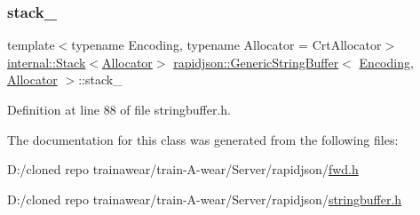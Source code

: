 \subsubsection{\texorpdfstring{stack\_}{stack\_}}
{\footnotesize\ttfamily template$<$typename Encoding, typename Allocator = Crt\+Allocator$>$ \\
\mbox{\hyperlink{classrapidjson_1_1internal_1_1_stack}{internal\+::\+Stack}}$<$\mbox{\hyperlink{classrapidjson_1_1_allocator}{Allocator}}$>$ \mbox{\hyperlink{classrapidjson_1_1_generic_string_buffer}{rapidjson\+::\+Generic\+String\+Buffer}}$<$ \mbox{\hyperlink{classrapidjson_1_1_encoding}{Encoding}}, \mbox{\hyperlink{classrapidjson_1_1_allocator}{Allocator}} $>$\+::stack\+\_\+\hspace{0.3cm}{\ttfamily [mutable]}}



Definition at line 88 of file stringbuffer.\+h.



The documentation for this class was generated from the following files\+:\begin{DoxyCompactItemize}
\item 
D\+:/cloned repo trainawear/train-\/\+A-\/wear/\+Server/rapidjson/\mbox{\hyperlink{fwd_8h}{fwd.\+h}}\item 
D\+:/cloned repo trainawear/train-\/\+A-\/wear/\+Server/rapidjson/\mbox{\hyperlink{stringbuffer_8h}{stringbuffer.\+h}}\end{DoxyCompactItemize}
